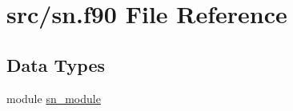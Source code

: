 \hypertarget{sn_8f90}{\section{src/sn.f90 File Reference}
\label{sn_8f90}
}
\subsection*{Data Types}
\begin{DoxyCompactItemize}
\item 
module \hyperlink{classsn__module}{sn\-\_\-module}
\end{DoxyCompactItemize}
